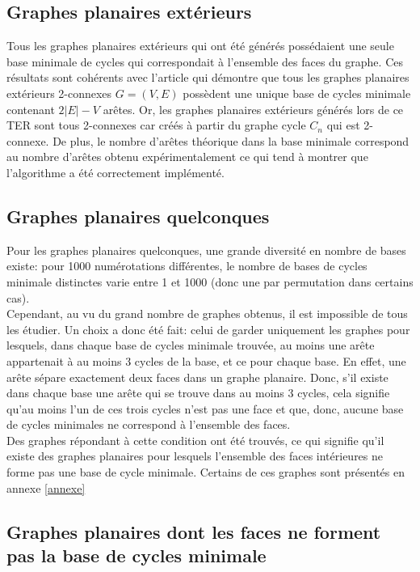 \documentclass{article}
\begin{document}
\subsection{Graphes planaires extérieurs}

Tous les graphes planaires extérieurs qui ont été générés possédaient une seule base minimale de cycles qui correspondait à l'ensemble des faces du graphe. Ces résultats sont cohérents avec l'article \cite{Outerplanar} qui démontre que tous les graphes planaires extérieurs 2-connexes $G=(V,E)$ possèdent une unique base de cycles minimale contenant $2\lvert E \rvert -V$ arêtes. Or, les graphes planaires extérieurs générés lors de ce TER sont tous 2-connexes car créés à partir du graphe cycle $C_n$ qui est 2-connexe. De plus, le nombre d'arêtes théorique dans la base minimale correspond au nombre d'arêtes obtenu expérimentalement ce qui tend à montrer que l'algorithme a été correctement implémenté.

\subsection{Graphes planaires quelconques}

Pour les graphes planaires quelconques, une grande diversité en nombre de bases existe: pour 1000 numérotations différentes, le nombre de bases de cycles minimale distinctes varie entre 1 et 1000 (donc une par permutation dans certains cas). \\

Cependant, au vu du grand nombre de graphes obtenus, il est impossible de tous les étudier. Un choix a donc été fait: celui de garder uniquement les graphes pour lesquels, dans chaque base de cycles minimale trouvée, au moins une arête appartenait à au moins 3 cycles de la base, et ce pour chaque base. En effet, une arête sépare exactement deux faces dans un graphe planaire. Donc, s'il existe dans chaque base une arête qui se trouve dans au moins 3 cycles, cela signifie qu'au moins l'un de ces trois cycles n'est pas une face et que, donc, aucune base de cycles minimales ne correspond à l'ensemble des faces. \\
Des graphes répondant à cette condition ont été trouvés, ce qui signifie qu'il existe des graphes planaires pour lesquels l'ensemble des faces intérieures ne forme pas une base de cycle minimale. Certains de ces graphes sont présentés en annexe \ref{annexe}

\subsection{Graphes planaires dont les faces ne forment pas la base de cycles minimale}
\end{document}
